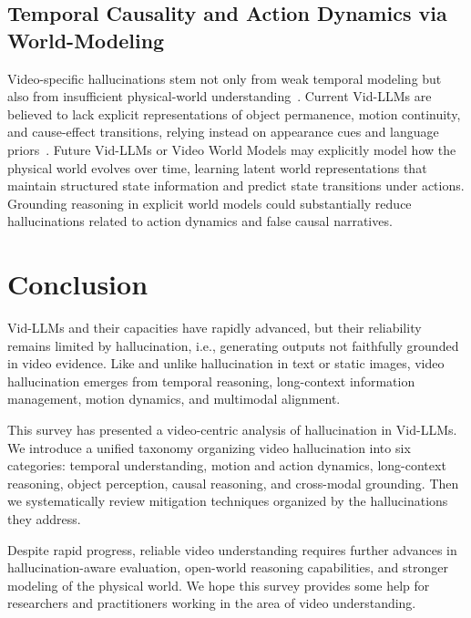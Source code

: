 \documentclass[10pt]{article} %
\begin{document}
\subsection{Temporal Causality and Action Dynamics via World-Modeling}
Video-specific hallucinations stem not only from weak temporal modeling but also from insufficient physical-world understanding~\citep{chang2025mitigating, tang2025can}. Current Vid-LLMs are believed to lack explicit representations of object permanence, motion continuity, and cause-effect transitions, relying instead on appearance cues and language priors~\citep{zhan2025phyvllm, liu2024pite}.
Future Vid-LLMs or Video World Models may explicitly model how the physical world evolves over time, learning latent world representations that maintain structured state information and predict state transitions under actions. Grounding reasoning in explicit world models could substantially reduce hallucinations related to action dynamics and false causal narratives.

\section{Conclusion}
\label{sec:conclusion}

Vid-LLMs and their capacities have rapidly advanced, but their reliability remains limited by hallucination, i.e., generating outputs not faithfully grounded in video evidence. Like and unlike hallucination in text or static images, video hallucination emerges from temporal reasoning, long-context information management, motion dynamics, and multimodal alignment.

This survey has presented a video-centric analysis of hallucination in Vid-LLMs. We introduce a unified taxonomy organizing video hallucination into six categories: temporal understanding, motion and action dynamics, long-context reasoning, object perception, causal reasoning, and cross-modal grounding. Then we systematically review mitigation techniques organized by the hallucinations they address.

Despite rapid progress, reliable video understanding requires further advances in hallucination-aware evaluation, open-world reasoning capabilities, and stronger modeling of the physical world. We hope this survey provides some help for researchers and practitioners working in the area of video understanding. %




%
\end{document}

